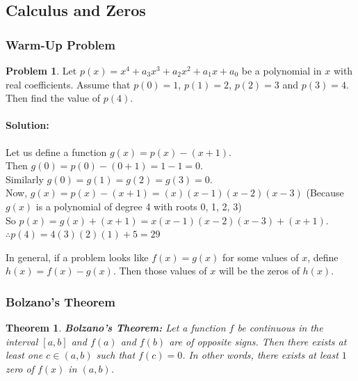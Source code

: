 \documentclass[14]{article}
\newtheorem{theorem}{Theorem}
\theoremstyle{definition}
\newtheorem{prob}{Problem}
\theoremstyle{case}
\begin{document}
\subsection{Calculus and Zeros}
\subsubsection{Warm-Up Problem}
\begin{prob}
Let $p(x) = x^4 + a_3x^3 + a_2 x^2 + a_1x + a_0$ be a polynomial in $x$ with real coefficients. Assume that $p(0) = 1$, $p(1) = 2$, $p(2) = 3$ and $p(3) = 4$. Then find the value of $p(4)$.
\paragraph{Solution:} Let us define a function $g(x) = p(x) - (x + 1)$.\\
Then $g(0) = p(0) - (0 + 1) = 1 - 1 = 0$.\\
Similarly $g(0) = g(1) = g(2) = g(3) = 0$.\\
Now, $g(x) =  p(x) - (x + 1) = (x)(x-1)(x-2)(x-3)$ (Because $g(x)$ is a polynomial of degree 4 with roots 0, 1, 2, 3)\\
So $p(x) = g(x) + (x +1) = x(x-1)(x-2)(x-3) + (x + 1) $.\\  
$\therefore p(4) = 4(3)(2)(1) + 5 = 29$
\end{prob}
In general, if a problem looks like $f(x) = g(x)$ for some values of $x$, define $h(x) = f(x) - g(x).$ Then those values of $x$ will be the zeros of $h(x)$.
\subsubsection{Bolzano's Theorem}
\begin{theorem}
\textbf{Bolzano's Theorem:} Let a function $f$ be continuous in the interval $[a, b]$ and $f(a)$ and $f(b)$ are of opposite signs. Then there exists at least one $c \in (a, b)$ such that $f(c) = 0$. In other words, there exists at least $1$ zero of $f(x)$ in $(a, b)$.
\end{theorem}
\end{document}
